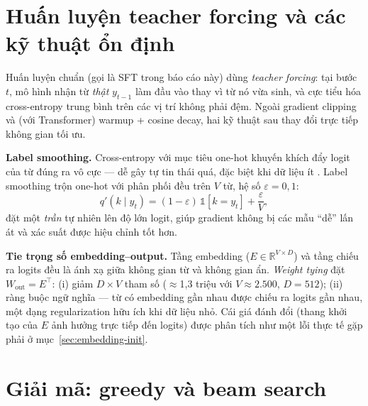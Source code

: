 \section{Huấn luyện teacher forcing và các kỹ thuật ổn định}

Huấn luyện chuẩn (gọi là SFT trong báo cáo này) dùng \emph{teacher forcing}:
tại bước $t$, mô hình nhận từ \emph{thật} $y_{t-1}$ làm đầu vào thay vì từ nó
vừa sinh, và cực tiểu hóa cross-entropy trung bình trên các vị trí không phải
đệm. Ngoài gradient clipping và (với Transformer) warmup + cosine decay, hai kỹ
thuật sau thay đổi trực tiếp không gian tối ưu.

\textbf{Label smoothing.} Cross-entropy với mục tiêu one-hot khuyến khích đẩy
logit của từ đúng ra vô cực --- dễ gây tự tin thái quá, đặc biệt khi dữ liệu ít
\autocite{szegedy2016rethinking}. Label smoothing trộn one-hot với phân phối
đều trên $V$ từ, hệ số $\varepsilon = 0{,}1$:
\begin{equation}
	q'(k \mid y_t) = (1-\varepsilon)\, \mathbb{1}[k = y_t] +
	\frac{\varepsilon}{V},
\end{equation}
đặt một \emph{trần} tự nhiên lên độ lớn logit, giúp gradient không bị các mẫu
``dễ'' lấn át và xác suất được hiệu chỉnh tốt hơn.

\textbf{Tie trọng số embedding--output.} Tầng embedding
($E \in \mathbb{R}^{V\times D}$) và tầng chiếu ra logits đều là ánh xạ giữa
không gian từ và không gian ẩn. \emph{Weight tying} \autocite{press2017using}
đặt $W_{\text{out}} = E^\top$: (i) giảm $D \times V$ tham số ($\approx$1,3
triệu với $V \approx 2.500$, $D = 512$); (ii) ràng buộc ngữ nghĩa --- từ có
embedding gần nhau được chiếu ra logits gần nhau, một dạng regularization hữu
ích khi dữ liệu nhỏ. Cái giá đánh đổi (thang khởi tạo của $E$ ảnh hưởng trực
tiếp đến logits) được phân tích như một lỗi thực tế gặp phải ở
mục~\ref{sec:embedding-init}.

\section{Giải mã: greedy và beam search}

